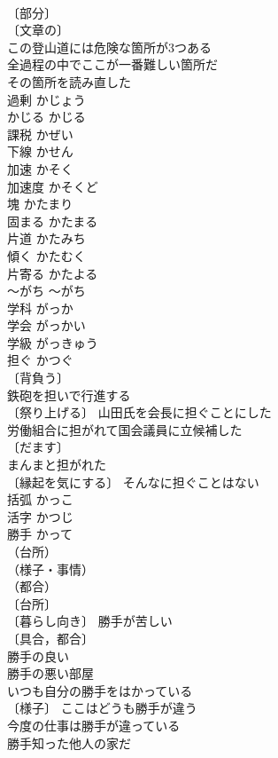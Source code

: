 \documentclass[8pt]{extreport}
\begin{document}
\begin{CJK}{UTF8}{min}
\\	〔部分〕
\\	〔文章の〕
\\	この登山道には危険な箇所が3つある 
\\	全過程の中でここが一番難しい箇所だ 
\\	その箇所を読み直した 
\\	過剰	かじょう	
\\	かじる	かじる	
\\	課税	かぜい	
\\	下線	かせん	
\\	加速	かそく	
\\	加速度	かそくど	
\\	塊	かたまり	
\\	固まる	かたまる	
\\	片道	かたみち	
\\	傾く	かたむく	
\\	片寄る	かたよる	
\\	～がち	～がち	
\\	学科	がっか	
\\	学会	がっかい	
\\	学級	がっきゅう	
\\	担ぐ	かつぐ	
\\	〔背負う〕
\\	鉄砲を担いで行進する 
\\	〔祭り上げる〕 山田氏を会長に担ぐことにした 
\\	労働組合に担がれて国会議員に立候補した 
\\	〔だます〕
\\	まんまと担がれた 
\\	〔縁起を気にする〕 そんなに担ぐことはない 
\\	括弧	かっこ	
\\	活字	かつじ	
\\	勝手	かって	
\\	（台所）
\\	（様子・事情）
\\	（都合）
\\	〔台所〕
\\	〔暮らし向き〕 勝手が苦しい 
\\	〔具合，都合〕
\\	勝手の良い 
\\	勝手の悪い部屋 
\\	いつも自分の勝手をはかっている 
\\	〔様子〕 ここはどうも勝手が違う 
\\	今度の仕事は勝手が違っている 
\\	勝手知った他人の家だ 

\end{CJK}
\end{document}
